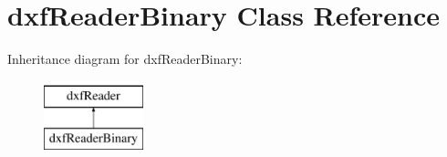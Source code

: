 \hypertarget{classdxfReaderBinary}{\section{dxf\-Reader\-Binary Class Reference}
\label{classdxfReaderBinary}
}
Inheritance diagram for dxf\-Reader\-Binary\-:\begin{figure}[H]
\begin{center}
\leavevmode
\includegraphics[height=2.000000cm]{classdxfReaderBinary}
\end{center}
\end{figure}
